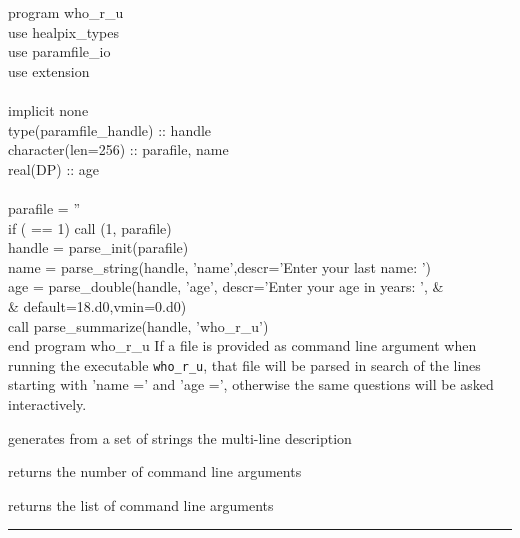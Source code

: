 \begin{example}
{
program who\_r\_u \\
use healpix\_types \\
use paramfile\_io \\
use extension \\
\\
implicit none \\
type(paramfile\_handle) :: handle \\
character(len=256) :: parafile, name \\
real(DP) :: age \\
\\
parafile = ''  \\
if ( == 1) call (1, parafile)  \\
handle = parse\_init(parafile)  \\
name  = parse\_string(handle, 'name',descr='Enter your last name: ')  \\
age   = parse\_double(handle, 'age', descr='Enter your age in years: ', \&   \\
   \& default=18.d0,vmin=0.d0)  \\
call parse\_summarize(handle, 'who\_r\_u')  \\
end program who\_r\_u 
}
{If a file is provided as command line argument when running the executable {\tt who\_r\_u}, that file
  will be parsed in search of the lines starting with 'name =' and 'age =',
  otherwise the same questions will be asked interactively.
}
\end{example}

\begin{related}
  \begin{sulist}{} %
  \item[\htmlref{concatnl}{sub:concatnl}] generates from a set of strings the
  multi-line description
  \item[\htmlref{nArguments}{sub:narguments}] returns the number of
  command line arguments
  \item[\htmlref{getArgument}{sub:getArgument}] returns the list of command line arguments
  \end{sulist}
\end{related}

\rule{\hsize}{2mm}

\newpage
